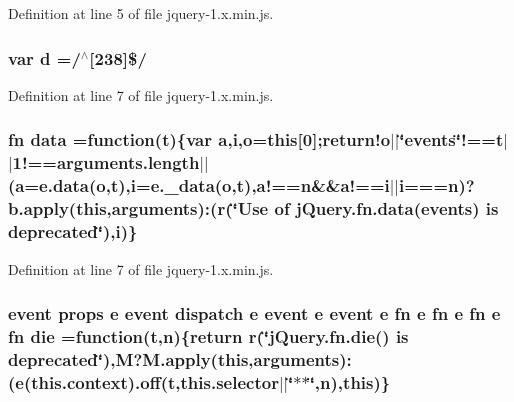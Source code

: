 Definition at line 5 of file jquery-\/1.\+x.\+min.\+js.

\subsubsection[{\texorpdfstring{d}{d}}]{\setlength{\rightskip}{0pt plus 5cm}var d =/$^\wedge$\mbox{[}238\mbox{]}\$/}\hypertarget{jquery-1_8x_8min_8js_aeb337d295abaddb5ec3cb34cc2e2bbc9}{}\label{jquery-1_8x_8min_8js_aeb337d295abaddb5ec3cb34cc2e2bbc9}


Definition at line 7 of file jquery-\/1.\+x.\+min.\+js.

\subsubsection[{\texorpdfstring{data}{data}}]{ {\bf fn} data =function({\bf t})\{var {\bf a},{\bf i},{\bf o}={\bf this}\mbox{[}0\mbox{]};return!o$\vert$$\vert$\char`\"{}events\char`\"{}!==t$\vert$$\vert$1!=={\bf arguments.\+length}$\vert$$\vert$({\bf a}=e.\+data({\bf o},{\bf t}),{\bf i}=e.\+\_\+data({\bf o},{\bf t}),a!=={\bf n}\&\&a!=={\bf i}$\vert$$\vert${\bf i}==={\bf n})?b.\+apply({\bf this},arguments)\+:(r(\char`\"{}Use of j\+Query.\+fn.\+data(\textquotesingle{}events\textquotesingle{}) is deprecated\char`\"{}),i)\}}\hypertarget{jquery-1_8x_8min_8js_a7f60fda3d1d4191e549df075eeacf25b}{}\label{jquery-1_8x_8min_8js_a7f60fda3d1d4191e549df075eeacf25b}


Definition at line 7 of file jquery-\/1.\+x.\+min.\+js.

\subsubsection[{\texorpdfstring{die}{die}}]{ event props {\bf e} event dispatch {\bf e} event {\bf e} event {\bf e} {\bf fn} {\bf e} {\bf fn} {\bf e} {\bf fn} {\bf e} {\bf fn} die =function({\bf t},{\bf n})\{return r(\char`\"{}j\+Query.\+fn.\+die() is deprecated\char`\"{}),M?M.\+apply({\bf this},arguments)\+:({\bf e}(this.\+context).off({\bf t},this.\+selector$\vert$$\vert$\char`\"{}$\ast$$\ast$\char`\"{},{\bf n}),{\bf this})\}}\hypertarget{jquery-1_8x_8min_8js_a8000af92246746444c1d08e9650d86af}{}\label{jquery-1_8x_8min_8js_a8000af92246746444c1d08e9650d86af}


